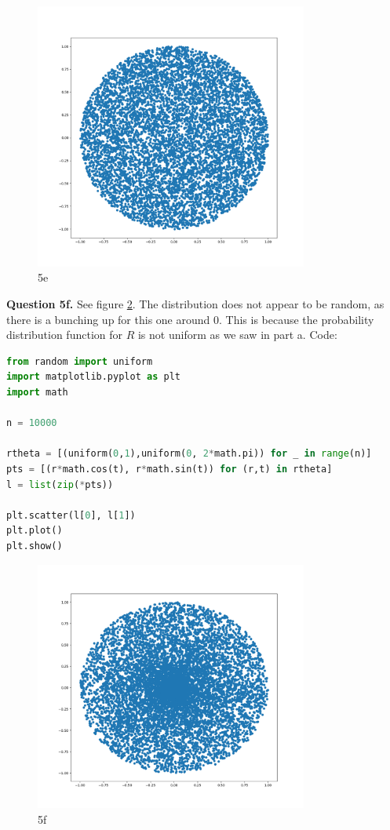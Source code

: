 \documentclass[letterpaper, reqno,11pt]{article}
\begin{document}
\begin{figure}[htpb]
    \centering
    \includegraphics[width=0.8\textwidth]{5e}
    \caption{5e}
    \label{fig:5e}
\end{figure}

{\medskip\noindent\bf Question 5f.} See figure \ref{fig:5f}. The distribution does not appear to be random, as there is a bunching up for this one around 0. This is because the probability distribution function for $R$ is not uniform as we saw in part a. Code: 

\begin{lstlisting}[language=Python]
from random import uniform
import matplotlib.pyplot as plt
import math

n = 10000

rtheta = [(uniform(0,1),uniform(0, 2*math.pi)) for _ in range(n)]
pts = [(r*math.cos(t), r*math.sin(t)) for (r,t) in rtheta]
l = list(zip(*pts))

plt.scatter(l[0], l[1])
plt.plot()
plt.show()
\end{lstlisting}

\begin{figure}[htpb]
    \centering
    \includegraphics[width=0.8\textwidth]{5f}
    \caption{5f}
    \label{fig:5f}
\end{figure}
\end{document}
